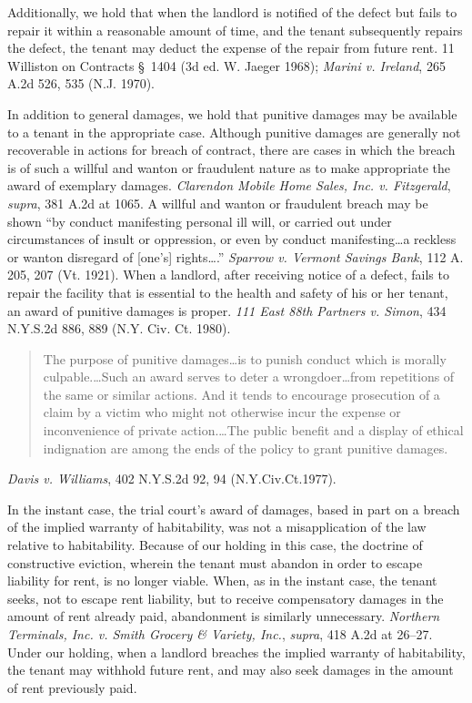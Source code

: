 Additionally, we hold that when the landlord is notified of the defect but fails
to repair it within a reasonable amount of time, and the tenant subsequently
repairs the defect, the tenant may deduct the expense of the repair from future
rent. 11 Williston on Contracts \S~1404 (3d ed. W. Jaeger 1968);
\textit{Marini v. Ireland}, 265 A.2d 526, 535 (N.J. 1970).

In addition to general damages, we hold that punitive damages may be available
to a tenant in the appropriate case. Although punitive damages are generally
not recoverable in actions for breach of contract, there are cases in which the
breach is of such a willful and wanton or fraudulent nature as to make
appropriate the award of exemplary damages. \textit{Clarendon Mobile Home
Sales, Inc. v. Fitzgerald}, \textit{supra}, 381 A.2d at 1065. A willful and
wanton or fraudulent breach may be shown ``by conduct manifesting personal ill
will, or carried out under circumstances of insult or oppression, or even by
conduct manifesting\ldots a reckless or wanton disregard of [one's]
rights\ldots.'' \textit{Sparrow v. Vermont Savings Bank}, 112 A. 205, 207 (Vt.
1921).
When a landlord, after receiving notice of a defect, fails to repair the
facility that is essential to the health and safety of his or her tenant, an
award of punitive damages is proper. \textit{111 East 88th Partners v. Simon},
434 N.Y.S.2d 886, 889 (N.Y. Civ. Ct. 1980).
\begin{quote}
The purpose of punitive damages\ldots is to punish conduct which is morally
culpable.\ldots  Such an award serves to deter a wrongdoer\ldots from
repetitions of the same or similar actions. And it tends to encourage
prosecution of a claim by a victim who might not otherwise incur the expense or
inconvenience of private action.\ldots The public benefit and a display of
ethical indignation are among the ends of the policy to grant punitive damages.
\end{quote}
\textit{Davis v. Williams}, 402 N.Y.S.2d 92, 94 (N.Y.Civ.Ct.1977).

In the instant case, the trial court's award of damages, based in part on a
breach of the implied warranty of habitability, was not a misapplication of the
law relative to habitability. Because of our holding in this case, the doctrine
of constructive eviction, wherein the tenant must abandon in order to escape
liability for rent, is no longer viable. When, as in the instant case, the
tenant seeks, not to escape rent liability, but to receive compensatory damages
in the amount of rent already paid, abandonment is similarly unnecessary.
\textit{Northern Terminals, Inc. v. Smith Grocery \& Variety, Inc.},
\textit{supra}, 418 A.2d at 26--27. Under our holding, when a landlord breaches
the implied warranty of habitability, the tenant may withhold future rent, and
may also seek damages in the amount of rent previously paid.

